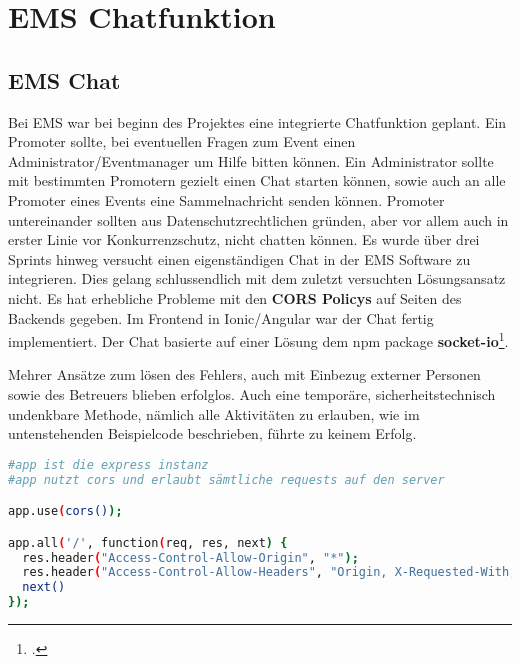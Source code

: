 \chapter{EMS Chatfunktion}
\putz

\section{EMS Chat}
Bei EMS war bei beginn des Projektes eine integrierte Chatfunktion geplant. Ein Promoter sollte, bei eventuellen Fragen zum Event einen Administrator/Eventmanager um Hilfe bitten können. Ein Administrator sollte mit bestimmten
Promotern gezielt einen Chat starten können, sowie auch an alle Promoter eines Events eine Sammelnachricht senden können. Promoter untereinander sollten aus Datenschutzrechtlichen gründen, aber vor allem auch in erster
Linie vor Konkurrenzschutz, nicht chatten können.
Es wurde über drei Sprints hinweg versucht einen eigenständigen Chat in der EMS Software zu integrieren. Dies gelang schlussendlich mit dem zuletzt versuchten Lösungsansatz nicht.
Es hat erhebliche Probleme mit den \textbf{CORS Policys} auf Seiten des Backends gegeben. Im Frontend in Ionic/Angular war der Chat fertig implementiert. Der Chat basierte auf einer Lösung dem npm package \textbf{socket-io}\footcite{socket-io}.


Mehrer Ansätze zum lösen des Fehlers, auch mit Einbezug externer Personen sowie des Betreuers blieben erfolglos. Auch eine temporäre, sicherheitstechnisch undenkbare Methode, nämlich alle Aktivitäten zu erlauben, wie im untenstehenden Beispielcode beschrieben, führte zu keinem Erfolg.

\begin{lstlisting}[language=bash]
#app ist die express instanz
#app nutzt cors und erlaubt sämtliche requests auf den server 

app.use(cors());

app.all('/', function(req, res, next) {
  res.header("Access-Control-Allow-Origin", "*");
  res.header("Access-Control-Allow-Headers", "Origin, X-Requested-With, Content-Type, Accept");
  next()
});
\end{lstlisting}

